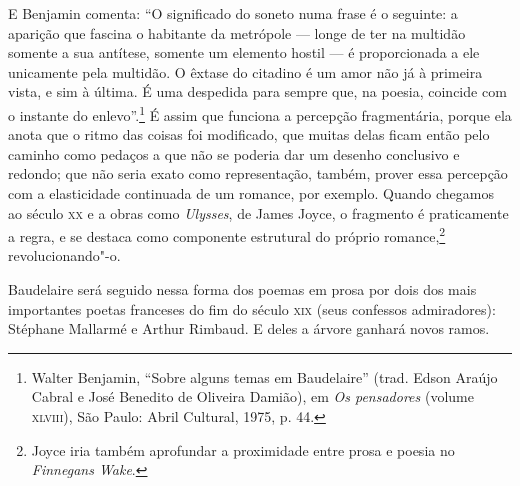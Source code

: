 E Benjamin comenta: “O significado do soneto numa frase é o seguinte: a
aparição que fascina o habitante da metrópole --- longe de ter na
multidão somente a sua antítese, somente um elemento hostil --- é
proporcionada a ele unicamente pela multidão. O êxtase do citadino é um
amor não já à primeira vista, e sim à última. É uma despedida para
sempre que, na poesia, coincide com o instante do enlevo”.\footnote{
 Walter Benjamin, “Sobre alguns temas em Baudelaire” (trad. Edson
Araújo Cabral e José Benedito de Oliveira Damião), em \textit{Os pensadores}
(volume \textsc{xlviii}), São Paulo: Abril Cultural, 1975, p. 44.} É assim que
funciona a percepção fragmentária, porque ela anota que o ritmo das
coisas foi modificado, que muitas delas ficam então pelo caminho como
pedaços a que não se poderia dar um desenho conclusivo e redondo; que
não seria exato como representação, também, prover essa percepção com a
elasticidade continuada de um romance, por exemplo. Quando chegamos ao
século \textsc{xx} e a obras como \textit{Ulysses}, de James Joyce, o fragmento
é praticamente a regra, e se destaca como componente estrutural do
próprio romance,\footnote{ Joyce iria também aprofundar a proximidade
entre prosa e poesia no \textit{Finnegans Wake}.} revolucionando"-o.

Baudelaire será seguido nessa forma dos poemas em prosa por dois dos
mais importantes poetas franceses do fim do século \textsc{xix} (seus
confessos admiradores): Stéphane Mallarmé e Arthur Rimbaud. E deles a
árvore ganhará novos ramos.



